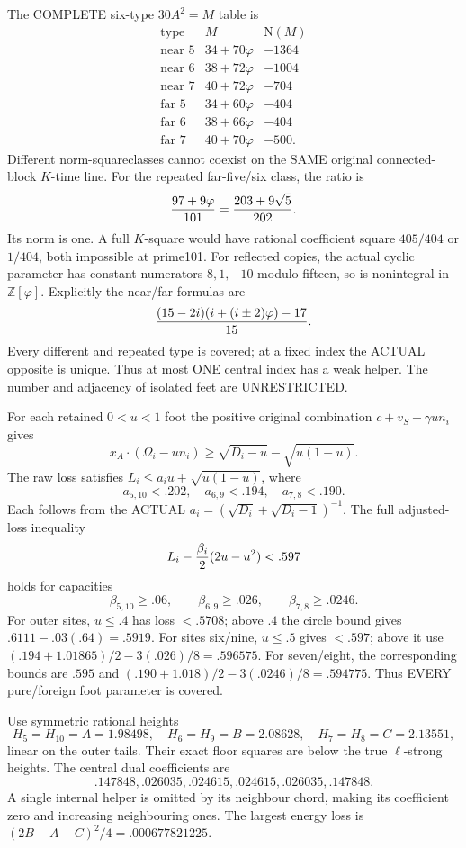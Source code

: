 \documentclass[11pt]{article}
\begin{document}
The COMPLETE six-type \(30A^2=M\) table is
\[
\begin{array}{c|c|r}
 \text{type}&M&\mathrm N(M)\\ \hline
 \text{near }5&34+70\varphi&-1364\\
 \text{near }6&38+72\varphi&-1004\\
 \text{near }7&40+72\varphi&-704\\
 \text{far }5&34+60\varphi&-404\\
 \text{far }6&38+66\varphi&-404\\
 \text{far }7&40+70\varphi&-500 .
\end{array}
\]
Different norm-squareclasses cannot coexist on
the SAME original connected-block \(K\)-time line.
For the repeated far-five/six class, the ratio is
\[
                         {97+9\varphi\over101}
                              ={203+9\sqrt5\over202}.
\]
Its norm is one.
A full \(K\)-square would have rational
coefficient square \(405/404\) or \(1/404\),
both impossible at prime101.
For reflected copies, the actual cyclic parameter
has constant numerators \(8,1,-10\) modulo fifteen,
so is nonintegral in \(\mathbb Z[\varphi]\).
Explicitly the near/far formulas are
\[
 { (15-2i)(i+(i\pm2)\varphi)-17\over15}.
\]
Every different and repeated type is covered;
at a fixed index the ACTUAL opposite is unique.
Thus at most ONE central index has a weak helper.
The number and adjacency of isolated feet are
UNRESTRICTED.

For each retained \(0<u<1\) foot the positive
original combination
\(c+v_S+\gamma u n_i\) gives
\[
 x_A\cdot(\Omega_i-un_i)\ge
                    \sqrt{D_i-u}-\sqrt{u(1-u)} .
\]
The raw loss satisfies
\(L_i\le a_i u+\sqrt{u(1-u)}\), where
\[
 a_{5,10}<.202,\quad a_{6,9}<.194,\quad
 a_{7,8}<.190 .
\]
Each follows from the ACTUAL
\(a_i=(\sqrt{D_i}+\sqrt{D_i-1})^{-1}\).
The full adjusted-loss inequality
\[
                 L_i-{\beta_i\over2}(2u-u^2)<.597
\]
holds for capacities
\[
 \beta_{5,10}\ge.06,\qquad
 \beta_{6,9}\ge.026,\qquad
 \beta_{7,8}\ge.0246 .
\]
For outer sites, \(u\le.4\) has loss \(<.5708\);
above \(.4\) the circle bound gives
\(.6111-.03(.64)=.5919\).
For sites six/nine, \(u\le.5\) gives \(<.597\);
above it use
\((.194+1.01865)/2-3(.026)/8=.596575\).
For seven/eight, the corresponding bounds are
\(.595\) and
\((.190+1.018)/2-3(.0246)/8=.594775\).
Thus EVERY pure/foreign foot parameter is covered.

Use symmetric rational heights
\[
 H_5=H_{10}=A=1.98498,\quad
 H_6=H_9=B=2.08628,\quad
 H_7=H_8=C=2.13551,
\]
linear on the outer tails.
Their exact floor squares are below the true
\(\ell\)-strong heights.
The central dual coefficients are
\[
                  .147848,.026035,.024615,
                  .024615,.026035,.147848 .
\]
A single internal helper is omitted by its
neighbour chord, making its coefficient zero
and increasing neighbouring ones.
The largest energy loss is
\((2B-A-C)^2/4=.000677821225\).
\end{document}
